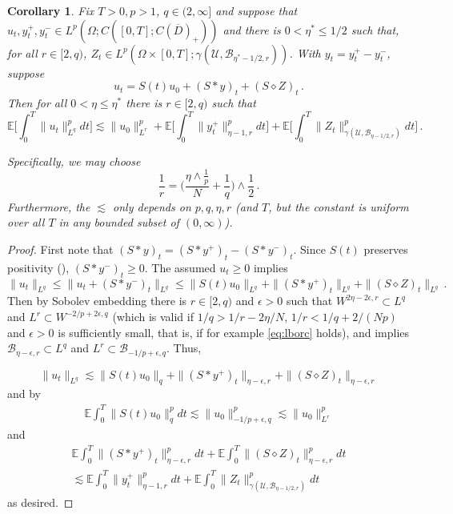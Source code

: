\documentclass[final]{amsart}
\newtheorem{cor}[thm]{Corollary}
\numberwithin{thm}{section}
\numberwithin{equation}{section}
\newcommand{\E}{\mathbb{E}}
\newcommand{\U}{\mathcal{U}}
\newcommand{\B}{\mathcal{B}}
\newcommand{\cdom}{C(\overline D)_+}
\begin{document}
\begin{cor}\label{lq-to-lr}
    Fix $T > 0,p > 1$, $q \in (2,\infty]$ and suppose that $u_t,y_t^+,y_t^- \in L^p(\Omega;C([0,T];\cdom))$ and there is $0 < \eta^* \leq 1/2$ such that, for all $r \in [2,q)$, $Z_t \in L^p(\Omega \times [0,T]; \gamma(\U,\B_{\eta^*-1/2,r}))$. With $y_t = y^+_t - y_t^-$, suppose
    $$u_t = S(t)u_0 + (S * y)_t + (S \diamond Z)_t \,.$$
    Then for all $0 < \eta \leq \eta^*  $ there is $r \in [2,q)$ such that
    $$
    \E\Big[\int_0^T \|u_t\|_{L^q}^pdt\Big] \lesssim \|u_0\|_{L^r}^p + \E\Big[\int_0^T \|y^+_t\|_{\eta-1,r}^pdt\Big] + \E\Big[\int_0^T \|Z_t\|_{\gamma(\U,\B_{\eta-1/2,r})}^p dt\Big] \,.
    $$
    
    Specifically, we may choose 
    \begin{equation}\label{eq:lborc}
    \frac{1}{r} = \Big(\frac{\eta\wedge \frac{1}{p}}{N} + \frac{1}{q}\Big) \wedge \frac{1}{2} \,.
    \end{equation}
    Furthermore, the $\lesssim$ only depends on $p,q,\eta,r$ (and $T$, but the constant is uniform over all $T$ in any bounded subset of $(0,\infty)$).
\end{cor}

\begin{proof}
    First note that $(S * y)_t = (S * y^+)_t - (S * y^-)_t$. Since $S(t)$ preserves positivity (), $(S * y^-)_t \geq 0$. The assumed $u_t \geq 0$ implies
    \begin{equation}\label{eq:lq-to-lr}
        \|u_t\|_{L^q} \leq \|u_t + (S * y^-)_t\|_{L^q} \leq \|S(t)u_0\|_{L^q} + \|(S * y^+)_t\|_{L^q} + \|(S \diamond Z)_t\|_{L^q} \,.
    \end{equation}
    Then by Sobolev embedding there is $r \in [2,q)$ and $\epsilon > 0$ such that $W^{2\eta-2\epsilon,r} \subset L^q$ and 
    $L^r \subset W^{-2/p + 2\epsilon, q}$ (which is valid if $1/q > 1/r - 2\eta/N$, $1/r < 1/q + 2/(Np) $ and $\epsilon > 0$ is sufficiently small, that is, if for example \eqref{eq:lborc} holds), and  implies $\B_{\eta - \epsilon,r} \subset L^q$ and $L^r \subset \B_{-1/p + \epsilon,q}$. Thus,
    
    
    
    
\begin{equation*}
        \|u_t\|_{L^q} \lesssim \|S(t)u_0\|_{q} + 
        \|(S * y^+)_t\|_{\eta-\epsilon,r} + \|(S \diamond Z)_t\|_{\eta-\epsilon,r} 
    \end{equation*}
and by 
\begin{align*}
 \E\int_0^T\|S(t)u_0\|_{q}^p dt \lesssim \|u_0\|^p_{-1/p+\epsilon, q} \lesssim \|u_0\|^p_{L^r} 
 \end{align*}
 and
 \begin{multline*}
 \E\int_0^T\|(S * y^+)_t\|_{\eta-\epsilon,r}^p dt+ \E\int_0^T\|(S \diamond Z)_t\|_{\eta-\epsilon,r}^p dt \\
 \lesssim
 \E\int_0^T\|y^+_t\|_{\eta-1,r}^p dt+ \E\int_0^T\| Z_t\|_{\gamma(\U,\B_{\eta-1/2,r})}^p dt    
 \end{multline*}
as desired.  
\end{proof}
\end{document}
